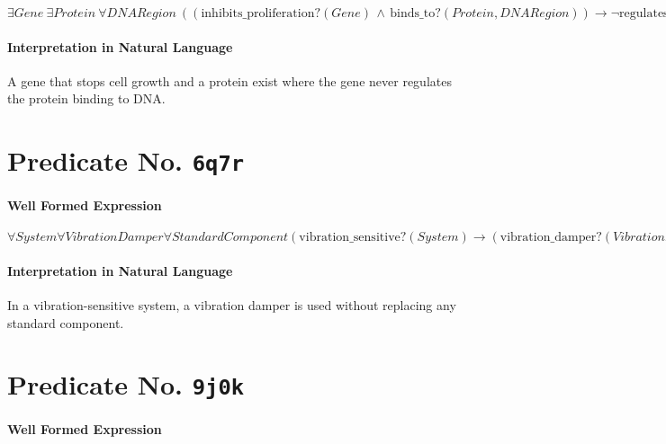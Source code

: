 \documentclass[11pt]{article}
\begin{document}
\(\exists \mathit{Gene}\ \exists \mathit{Protein}\ \forall \mathit{DNARegion}\ ((\mathrm{inhibits\_proliferation?}(\mathit{Gene}) \,\land\, \mathrm{binds\_to?}(\mathit{Protein}, \mathit{DNARegion})) \rightarrow \neg \mathrm{regulates\_binding?}(\mathit{Gene}, \mathit{Protein}, \mathit{DNARegion}))\)

\paragraph*{Interpretation in Natural Language}
\label{sec:org92ab63c}

A gene that stops cell growth and a protein exist where the gene never regulates the protein binding to DNA.



\section{Predicate No. \texttt{6q7r}}
\label{sec:org40ffe2d}

\paragraph*{Well Formed Expression}
\label{sec:org5095a80}

\(\forall \mathit{System} \forall \mathit{VibrationDamper} \forall \mathit{StandardComponent} (\mathrm{vibration\_sensitive?}(\mathit{System}) \rightarrow (\mathrm{vibration\_damper?}(\mathit{VibrationDamper}) \land \neg \mathrm{replaced\_by?}(\mathit{StandardComponent}, \mathit{VibrationDamper})))\)

\paragraph*{Interpretation in Natural Language}
\label{sec:org15df037}

In a vibration-sensitive system, a vibration damper is used without replacing any standard component.



\section{Predicate No. \texttt{9j0k}}
\label{sec:orgeb52115}

\paragraph*{Well Formed Expression}
\label{sec:org94b2095}
\end{document}
